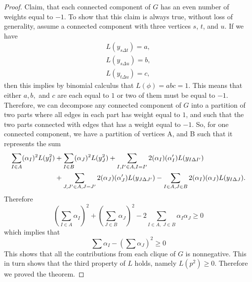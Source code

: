 \documentclass[a4paper,twoside,justified]{tufte-handout}
\begin{document}
\begin{proof}
Claim, that each connected component of $G$ has an even number of weights equal to $-1$. To show that this claim is always true, without loss of generality, assume a connected component with three vertices $s$, $t$, and $u$. If we have
\begin{equation*}
\begin{aligned}
L(y_{s\Delta t}) =a, \\
L(y_{s\Delta u}) =b, \\
L(y_{t\Delta u}) =c,
\end{aligned}
\end{equation*}
 then this implies by binomial calculus that $L(\phi) = abc = 1$. This means that either $a, b,$ and $c$ are each equal to $1$ or two of them must be equal to $-1$. Therefore, we can decompose any connected component of $G$ into a partition of two parts where all edges in each part has weight equal to $1$, and such that the two parts connected with  edges that has a weight equal to $-1$.
So, for one connected component, we have a partition of vertices A, and B such that it represents the sum
\begin{equation*}
\begin{aligned}
\sum_{I\in A} (\alpha_I)^2 L(y_I^2) &+ \sum_{I\in B} (\alpha_J)^2 L(y_J^2) + \sum_{I, I\rq{}\in A, I=I\rq{}} 2(\alpha_I)(\alpha_I\rq{}) L(y_{I\Delta I\rq{}})\\ &+ \sum_{J, J\rq{}\in A, J=J\rq{}} 2(\alpha_J)(\alpha_J\rq{}) L(y_{J\Delta J\rq{}}) - \sum_{I\in A, J \in B} 2(\alpha_I)(\alpha_J) L(y_{I\Delta J}).
\end{aligned}
\end{equation*}
Therefore
\begin{equation*}
(\sum_{I \in A} \alpha_I )^2 + ( \sum_{J \in B} \alpha_J)^2 - 2 \sum_{I \in A, \; J \in B} \alpha_I \alpha_J \geq 0
\end{equation*}
which implies that 
\begin{equation*}
\sum \alpha_I - (\sum \alpha_J)^2 \geq 0
\end{equation*}
This shows that all the contributions from each clique of $G$ is nonnegative. This in turn shows that the third property of $L$ holds, namely $L(p^2)\geq 0$.
Therefore we proved the theorem.
\end{proof}


\end{document}
